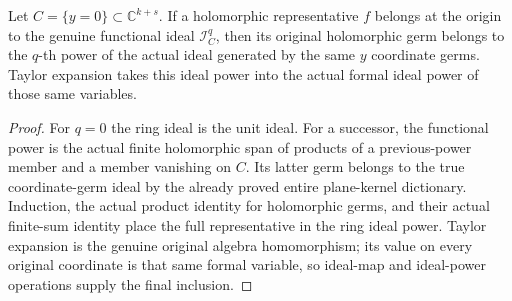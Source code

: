 \begin{lemma}
\label{hir:actual-original-plane-functional-power-germ-membership}
\leanok
Let $C=\{y=0\}\subset\mathbb C^{k+s}$. If a holomorphic representative
$f$ belongs at the origin to the genuine functional ideal
$\mathcal I_C^q$, then its original holomorphic germ belongs to the
$q$-th power of the actual ideal generated by the same $y$ coordinate
germs. Taylor expansion takes this ideal power into the actual formal
ideal power of those same variables.
\end{lemma}
\begin{proof}
For $q=0$ the ring ideal is the unit ideal. For a successor, the
functional power is the actual finite holomorphic span of products of a
previous-power member and a member vanishing on $C$. Its latter germ
belongs to the true coordinate-germ ideal by the already proved entire
plane-kernel dictionary. Induction, the actual product identity for
holomorphic germs, and their actual finite-sum identity place the full
representative in the ring ideal power. Taylor expansion is the genuine
original algebra homomorphism; its value on every original coordinate
is that same formal variable, so ideal-map and ideal-power operations
supply the final inclusion.
\end{proof}

